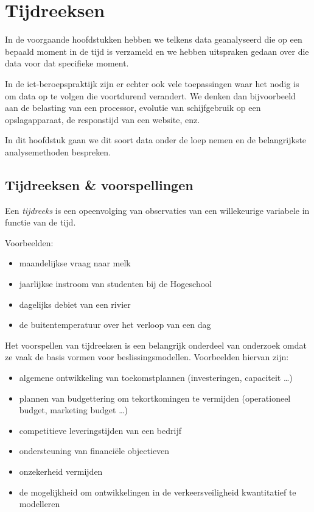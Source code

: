 \chapter{Tijdreeksen}
\label{ch:tijdreeksen}

In de voorgaande hoofdstukken hebben we telkens data geanalyseerd die op een bepaald moment in de tijd is verzameld en we hebben uitspraken gedaan over die data voor dat specifieke moment.

In de ict-beroepspraktijk zijn er echter ook vele toepassingen waar het nodig is om data op te volgen die voortdurend verandert. We denken dan bijvoorbeeld aan de belasting van een processor, evolutie van schijfgebruik op een opslagapparaat, de responstijd van een website, enz.

In dit hoofdstuk gaan we dit soort data onder de loep nemen en de belangrijkste analysemethoden bespreken.

\section{Tijdreeksen \& voorspellingen}

\begin{definition}[Tijdreeks]
Een \emph{tijdreeks} is een opeenvolging van observaties van een willekeurige variabele in functie van de tijd.
\end{definition}

Voorbeelden:

\begin{itemize}
	\item maandelijkse vraag naar melk
	\item jaarlijkse instroom van studenten bij de Hogeschool
	\item dagelijks debiet van een rivier
	\item de buitentemperatuur over het verloop van een dag
\end{itemize}

Het voorspellen van tijdreeksen is een belangrijk onderdeel van onderzoek omdat ze vaak de basis vormen voor beslissingsmodellen. Voorbeelden hiervan zijn:

\begin{itemize}
	\item algemene ontwikkeling van toekomstplannen (investeringen, capaciteit \dots)
	\item plannen van budgettering om tekortkomingen te vermijden (operationeel budget, marketing budget \dots)
	\item competitieve leveringstijden van een bedrijf
	\item ondersteuning van financiële objectieven
	\item onzekerheid vermijden
	\item de mogelijkheid om ontwikkelingen in de verkeersveiligheid
kwantitatief te modelleren
\end{itemize}

